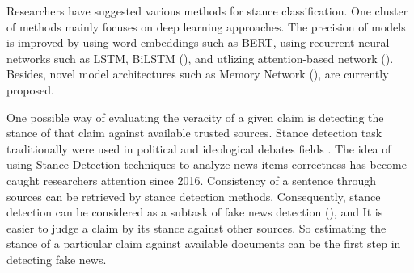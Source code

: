 Researchers have suggested various methods for stance classification. One cluster of methods mainly focuses on deep learning approaches. The precision of models is improved by using word embeddings such as BERT, using recurrent neural networks such as LSTM, BiLSTM (\cite{stanceCI}), and utlizing attention-based network (\cite{stanceCI}). Besides, novel model architectures such as Memory Network (\cite{memory_network}), are currently proposed.

One possible way of evaluating the veracity of a given claim is detecting the stance of that claim against available trusted sources. Stance detection task traditionally were used in political and ideological debates fields \citep{stance_robust}. The idea of using Stance Detection techniques to analyze news items correctness has become caught researchers attention since 2016. Consistency of a sentence through sources can be retrieved by stance detection methods. Consequently, stance detection can be considered as a subtask of fake news detection (\cite{book_datafake}), and It is easier to judge a claim by its stance against other sources. So estimating the stance of a particular claim against available documents can be the first step in detecting fake news. 
